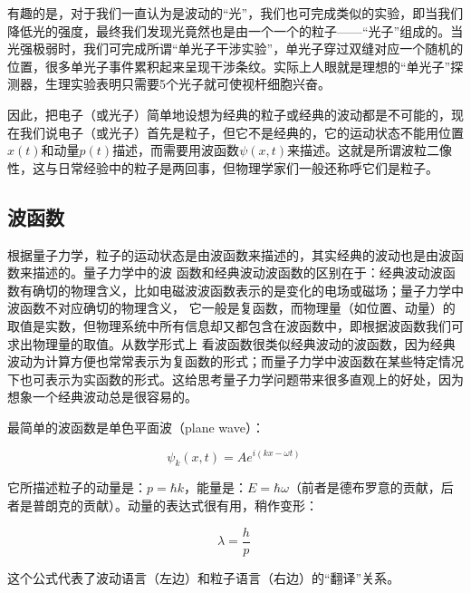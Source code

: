 有趣的是，对于我们一直认为是波动的“光”，我们也可完成类似的实验，即当我们降低光的强度，最终我们发现光竟然也是由一个一个的粒子——“光子”组成的。当光强极弱时，我们可完成所谓“单光子干涉实验”，单光子穿过双缝对应一个随机的位置，很多单光子事件累积起来呈现干涉条纹。实际上人眼就是理想的“单光子”探测器，生理实验表明只需要5个光子就可使视杆细胞兴奋。

因此，把电子（或光子）简单地设想为经典的粒子或经典的波动都是不可能的，现在我们说电子（或光子）首先是粒子，但它不是经典的，它的运动状态不能用位置$x(t)$和动量$p(t)$描述，而需要用波函数$\psi(x,t)$来描述。这就是所谓波粒二像性，这与日常经验中的粒子是两回事，但物理学家们一般还称呼它们是粒子。

\subsection{波函数}

根据量子力学，粒子的运动状态是由波函数来描述的，其实经典的波动也是由波函数来描述的。量子力学中的波
函数和经典波动波函数的区别在于：经典波动波函数有确切的物理含义，比如电磁波波函数表示的是变化的电场或磁场；量子力学中波函数不对应确切的物理含义，
它一般是复函数，而物理量（如位置、动量）的取值是实数，但物理系统中所有信息却又都包含在波函数中，即根据波函数我们可求出物理量的取值。从数学形式上
看波函数很类似经典波动的波函数，因为经典波动为计算方便也常常表示为复函数的形式；而量子力学中波函数在某些特定情况下也可表示为实函数的形式。这给思考量子力学问题带来很多直观上的好处，因为想象一个经典波动总是很容易的。

最简单的波函数是单色平面波（plane wave）：

\begin{equation}
\psi_k (x, t) = A e^{i(kx -\omega t)}~
\end{equation}

它所描述粒子的动量是：$p = \hbar k$，能量是：$E = \hbar
\omega$（前者是德布罗意的贡献，后者是普朗克的贡献）。动量的表达式很有用，稍作变形：

\begin{equation}
\lambda = \frac{h}{p}~
\end{equation}

这个公式代表了波动语言（左边）和粒子语言（右边）的“翻译”关系。